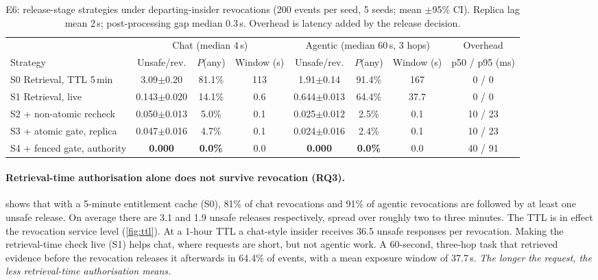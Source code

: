 \documentclass[10pt]{article}
\newcommand{\pmci}[1]{{\scriptsize$\pm$#1}}
\begin{document}
\begin{table}[t]
\centering
\caption{E6: release-stage strategies under departing-insider revocations (200 events per seed, 5 seeds; mean \pmci{95\% CI}). Replica lag mean 2\,s; post-processing gap median 0.3\,s. Overhead is latency added by the release decision.}
\label{tab:inflight}
\small
\setlength{\tabcolsep}{3.5pt}
\begin{tabular}{l|ccc|ccc|c}
\toprule
& \multicolumn{3}{c|}{Chat (median 4\,s)} & \multicolumn{3}{c|}{Agentic (median 60\,s, 3 hops)} & Overhead\\
Strategy & Unsafe/rev. & $P$(any) & Window (s) & Unsafe/rev. & $P$(any) & Window (s) & p50 / p95 (ms)\\
\midrule
S0 Retrieval, TTL 5\,min & 3.09\pmci{0.20} & 81.1\% & 113 & 1.91\pmci{0.14} & 91.4\% & 167 & 0 / 0\\
S1 Retrieval, live & 0.143\pmci{0.020} & 14.1\% & 0.6 & 0.644\pmci{0.013} & 64.4\% & 37.7 & 0 / 0\\
S2 + non-atomic recheck & 0.050\pmci{0.013} & 5.0\% & 0.1 & 0.025\pmci{0.012} & 2.5\% & 0.1 & 10 / 23\\
S3 + atomic gate, replica & 0.047\pmci{0.016} & 4.7\% & 0.1 & 0.024\pmci{0.016} & 2.4\% & 0.1 & 10 / 23\\
S4 + fenced gate, authority & \textbf{0.000} & \textbf{0.0\%} & 0.0 & \textbf{0.000} & \textbf{0.0\%} & 0.0 & 40 / 91\\
\bottomrule
\end{tabular}
\end{table}

\paragraph{Retrieval-time authorisation alone does not survive revocation (RQ3).}
 shows that with a 5-minute entitlement cache (S0), 81\% of chat revocations and 91\% of agentic revocations are followed by at least one unsafe release. On average there are 3.1 and 1.9 unsafe releases respectively, spread over roughly two to three minutes. The TTL is in effect the revocation service level (\cref{fig:ttl}). At a 1-hour TTL a chat-style insider receives 36.5 unsafe responses per revocation. Making the retrieval-time check live (S1) helps chat, where requests are short, but not agentic work. A 60-second, three-hop task that retrieved evidence before the revocation releases it afterwards in 64.4\% of events, with a mean exposure window of 37.7\,s. \emph{The longer the request, the less retrieval-time authorisation means.}
\end{document}
